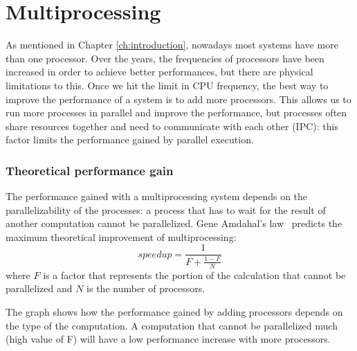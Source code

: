 \section{Multiprocessing}

As mentioned in Chapter \ref{ch:introduction}, nowadays most systems have more than one processor. Over the years, the frequencies of processors have been increased in order to achieve better performances, but there are physical limitations to this. Once we hit the limit in CPU frequency, the best way to improve the performance of a system is to add more processors. This allows us to run more processes in parallel and improve the performance, but processes often share resources together and need to communicate with each other (IPC): this factor limits the performance gained by parallel execution.

\subsubsection{Theoretical performance gain}
The performance gained with a multiprocessing system depends on the parallelizability of the processes: a process that has to wait for the result of another computation cannot be parallelized. Gene Amdahal's law~\cite{amdahl} predicts the maximum theoretical improvement of multiprocessing:
\begin{equation}
    speedup = \frac{1}{F + \frac{1-F}{N}}
\end{equation}
where $F$ is a factor that represents the portion of the calculation that cannot be parallelized and $N$ is the number of processors.

\label{fig:plot_cpu}

The graph shows how the performance gained by adding processors depends on the type of the computation. A computation that cannot be parallelized much (high value of F) will have a low performance increase with more processors. 

